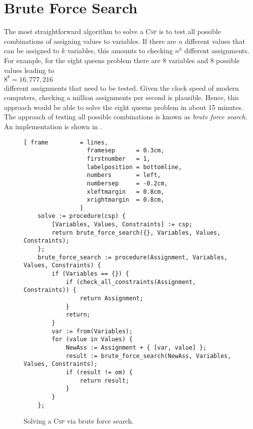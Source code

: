 \section{Brute Force Search}
The most straightforward algorithm to solve a \textsc{Csp} is to test all possible combinations of assigning
values to variables.  If there are $n$ different values that can be assigned to $k$ variables, this amounts to 
checking $n^k$ different assignments.  For example, for the eight queens problem there are 8 variables and
8 possible values leading to 
\\[0.2cm]
\hspace*{1.3cm}
$8^8 = 16,777,216$
\\[0.2cm]
different assignments that need to be tested.  Given the clock speed of modern computers, checking a million
assignments per second is plausible.  Hence, this approach would be able to solve the eight queens problem in
about 15 minutes.  The approach of testing all possible combinations is known as \emph{\color{blue}brute force search}.
An implementation is shown in .

\begin{figure}[!ht]
\centering
\begin{Verbatim}[ frame         = lines, 
                  framesep      = 0.3cm, 
                  firstnumber   = 1,
                  labelposition = bottomline,
                  numbers       = left,
                  numbersep     = -0.2cm,
                  xleftmargin   = 0.8cm,
                  xrightmargin  = 0.8cm,
                ]
    solve := procedure(csp) {
        [Variables, Values, Constraints] := csp;
        return brute_force_search({}, Variables, Values, Constraints);
    };
    brute_force_search := procedure(Assignment, Variables, Values, Constraints) {
        if (Variables == {}) {
            if (check_all_constraints(Assignment, Constraints)) {
                return Assignment;
            }
            return;
        }
        var := from(Variables);
        for (value in Values) {
            NewAss := Assignment + { [var, value] };
            result := brute_force_search(NewAss, Variables, Values, Constraints);
            if (result != om) {
                return result;
            }
        }
    };
\end{Verbatim}
\vspace*{-0.3cm}
\caption{Solving a \textsc{Csp} via brute force search.}
\label{fig:csp-brute-force.stlx}
\end{figure}

